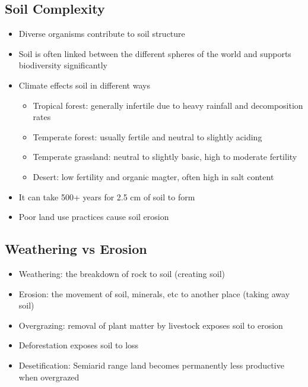 \documentclass[11pt]{article}
\begin{document}
\subsection{Soil Complexity}
\label{sec:org8207bd4}
\begin{itemize}
\item Diverse organisms contribute to soil structure
\item Soil is often linked between the different spheres of the world and supports biodiversity significantly
\item Climate effects soil in different ways
\begin{itemize}
\item Tropical forest: generally infertile due to heavy rainfall and decomposition rates
\item Temperate forest: usually fertile and neutral to slightly aciding
\item Temperate grassland: neutral to slightly basic, high to moderate fertility
\item Desert: low fertility and organic magter, often high in salt content
\end{itemize}
\item It can take 500+ years for 2.5 cm of soil to form
\item Poor land use practices cause soil erosion
\end{itemize}
\subsection{Weathering vs Erosion}
\label{sec:org84116da}
\begin{itemize}
\item Weathering: the breakdown of rock to soil (creating soil)
\item Erosion: the movement of soil, minerals, etc to another place (taking away soil)
\item Overgrazing: removal of plant matter by livestock exposes soil to erosion
\item Deforestation exposes soil to loss
\item Desetification: Semiarid range land becomes permanently less productive when overgrazed
\end{itemize}
\end{document}
